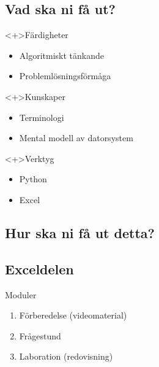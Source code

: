 \subsection{Vad ska ni få ut?}

\begin{frame}
  \begin{block}<+>{Färdigheter}
    \begin{itemize}
      \item Algoritmiskt tänkande
      \item Problemlösningsförmåga
    \end{itemize}
  \end{block}

  \begin{block}<+>{Kunskaper}
    \begin{itemize}
      \item Terminologi
      \item Mental modell av datorsystem
    \end{itemize}
  \end{block}

  \begin{block}<+>{Verktyg}
    \begin{itemize}
      \item Python
      \item Excel
    \end{itemize}
  \end{block}
\end{frame}

\subsection{Hur ska ni få ut detta?}

\subsection{Exceldelen}

\begin{frame}
  \begin{block}{Moduler}
    \begin{enumerate}
      \item Förberedelse (videomaterial)
      \item Frågestund
      \item Laboration (redovisning)
    \end{enumerate}
  \end{block}
\end{frame}

